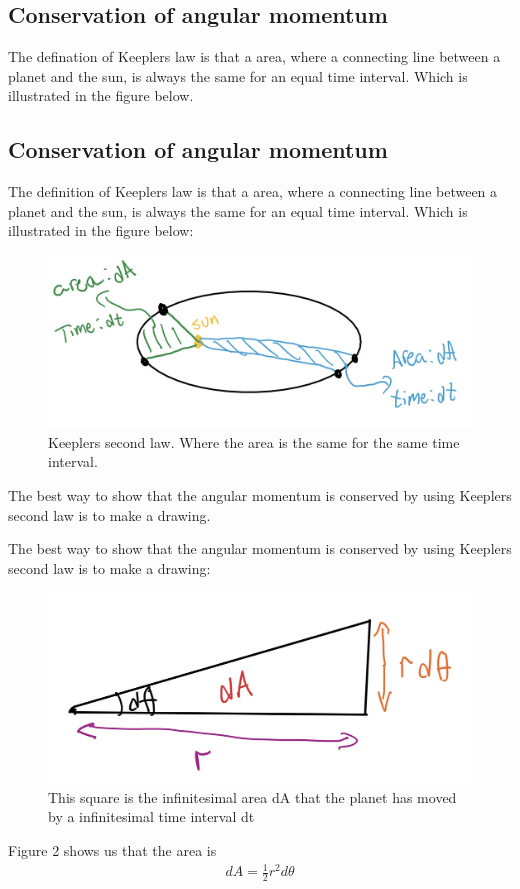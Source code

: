 \documentclass{article}
\begin{document}
\begin{multicols}{2}
\subsection{Conservation of angular momentum}
The defination of Keeplers law is that a area, where a connecting line between a planet and the sun, is always the same for an equal time interval. Which is illustrated in the figure below.


\subsection{Conservation of angular momentum}
The definition of Keeplers law is that a area, where a connecting line between a planet and the sun, is always the same for an equal time interval. Which is illustrated in the figure below:


\begin{figure}[H]
	\centering
	\includegraphics[width=\linewidth]{K2L.jpg}
	\caption{Keeplers second law. Where the area is the same for the same time interval.}
	\label{fig:1bplot}
\end{figure}

The best way to show that the angular momentum is conserved by using Keeplers second law is to make a drawing.


The best way to show that the angular momentum is conserved by using Keeplers second law is to make a drawing:

\begin{figure}[H]
	\centering
	\includegraphics[width=\linewidth]{sketch.jpg}
	\caption{This square is the infinitesimal area dA that the planet has moved by a infinitesimal time interval dt}
	\label{fig:1bplot}
\end{figure}
Figure 2 shows us that the area is 
\begin{align}
    dA=\frac{1}{2}r^2d\theta
\end{align}



\end{multicols}
\end{document}
